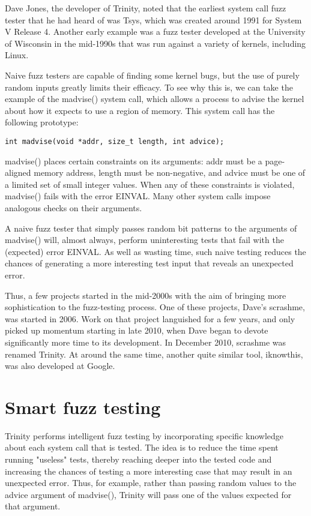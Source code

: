 \documentclass[twoside]{article}
\begin{document}
\begin{multicols}{2}
Dave Jones, the developer of Trinity, noted that the earliest system call fuzz tester that he had heard of was Tsys, which was created around 1991 for System V Release 4. Another early example was a fuzz tester developed at the University of Wisconsin in the mid-1990s that was run against a variety of kernels, including Linux.

Naive fuzz testers are capable of finding some kernel bugs, but the use of purely random inputs greatly limits their efficacy. To see why this is, we can take the example of the madvise() system call, which allows a process to advise the kernel about how it expects to use a region of memory. This system call has the following prototype:

{\footnotesize
\begin{lstlisting}
int madvise(void *addr, size_t length, int advice);
\end{lstlisting}
\par}

madvise() places certain constraints on its arguments: addr must be a page-aligned memory address, length must be non-negative, and advice must be one of a limited set of small integer values. When any of these constraints is violated, madvise() fails with the error EINVAL. Many other system calls impose analogous checks on their arguments.

A naive fuzz tester that simply passes random bit patterns to the arguments of madvise() will, almost always, perform uninteresting tests that fail with the (expected) error EINVAL. As well as wasting time, such naive testing reduces the chances of generating a more interesting test input that reveals an unexpected error.

Thus, a few projects started in the mid-2000s with the aim of bringing more sophistication to the fuzz-testing process. One of these projects, Dave's scrashme, was started in 2006. Work on that project languished for a few years, and only picked up momentum starting in late 2010, when Dave began to devote significantly more time to its development. In December 2010, scrashme was renamed Trinity. At around the same time, another quite similar tool, iknowthis, was also developed at Google.

\section{Smart fuzz testing}

Trinity performs intelligent fuzz testing by incorporating specific knowledge about each system call that is tested. The idea is to reduce the time spent running "useless" tests, thereby reaching deeper into the tested code and increasing the chances of testing a more interesting case that may result in an unexpected error. Thus, for example, rather than passing random values to the advice argument of madvise(), Trinity will pass one of the values expected for that argument.


\end{multicols}
\end{document}
